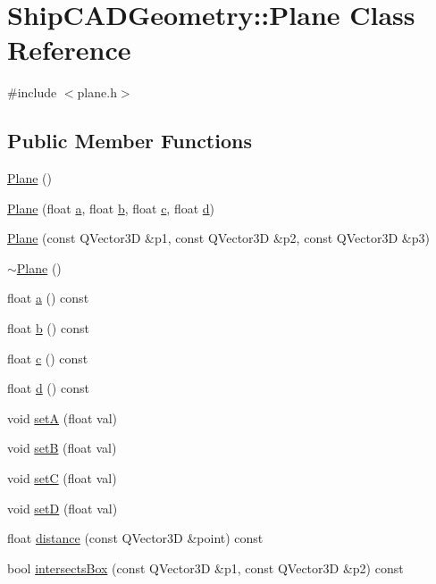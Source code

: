 \hypertarget{classShipCADGeometry_1_1Plane}{\section{Ship\-C\-A\-D\-Geometry\-:\-:Plane Class Reference}
\label{classShipCADGeometry_1_1Plane}
}


{\ttfamily \#include $<$plane.\-h$>$}

\subsection*{Public Member Functions}
\begin{DoxyCompactItemize}
\item 
\hyperlink{classShipCADGeometry_1_1Plane_acac0d9c003e0ab10d07b146c3566a0c7}{Plane} ()
\item 
\hyperlink{classShipCADGeometry_1_1Plane_a9a1420228e8baa632c7e8ba66f27772f}{Plane} (float \hyperlink{classShipCADGeometry_1_1Plane_a10415ad5e7667357729cc959e0996b30}{a}, float \hyperlink{classShipCADGeometry_1_1Plane_a5613d841f9e3c6af069f0beaf1a7c0fd}{b}, float \hyperlink{classShipCADGeometry_1_1Plane_aeedccb0995b432ba91083334d8458501}{c}, float \hyperlink{classShipCADGeometry_1_1Plane_a947034d0487902addd31d38d1556d4aa}{d})
\item 
\hyperlink{classShipCADGeometry_1_1Plane_adbaa1f5c7100e5592312359cb8eede37}{Plane} (const Q\-Vector3\-D \&p1, const Q\-Vector3\-D \&p2, const Q\-Vector3\-D \&p3)
\item 
\hyperlink{classShipCADGeometry_1_1Plane_ac89b14d37d595f51d24325a40488f927}{$\sim$\-Plane} ()
\item 
float \hyperlink{classShipCADGeometry_1_1Plane_a10415ad5e7667357729cc959e0996b30}{a} () const 
\item 
float \hyperlink{classShipCADGeometry_1_1Plane_a5613d841f9e3c6af069f0beaf1a7c0fd}{b} () const 
\item 
float \hyperlink{classShipCADGeometry_1_1Plane_aeedccb0995b432ba91083334d8458501}{c} () const 
\item 
float \hyperlink{classShipCADGeometry_1_1Plane_a947034d0487902addd31d38d1556d4aa}{d} () const 
\item 
void \hyperlink{classShipCADGeometry_1_1Plane_aa4741e4b523f68f17585580883e3b0bc}{set\-A} (float val)
\item 
void \hyperlink{classShipCADGeometry_1_1Plane_a629fb660d7053b4efa09e0eb8c21b093}{set\-B} (float val)
\item 
void \hyperlink{classShipCADGeometry_1_1Plane_a2e7b8636aa78d21630e3419933c0d0f2}{set\-C} (float val)
\item 
void \hyperlink{classShipCADGeometry_1_1Plane_a6920a08fe9e29c4fbf264f258e27ffa7}{set\-D} (float val)
\item 
float \hyperlink{classShipCADGeometry_1_1Plane_a6851b997a300848fcb37b33407165c44}{distance} (const Q\-Vector3\-D \&point) const 
\item 
bool \hyperlink{classShipCADGeometry_1_1Plane_a76d5f22d213962e8ab0880fae3e919df}{intersects\-Box} (const Q\-Vector3\-D \&p1, const Q\-Vector3\-D \&p2) const 
\end{DoxyCompactItemize}


